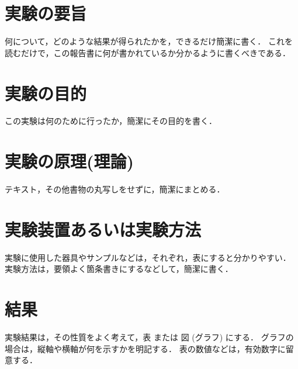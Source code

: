 \documentclass[12pt]{jarticle}
\begin{document}



\section{実験の要旨}
何について，どのような結果が得られたかを，できるだけ簡潔に書く．
これを読むだけで，この報告書に何が書かれているか分かるように書くべきである．

\section{実験の目的}
この実験は何のために行ったか，簡潔にその目的を書く．

\section{実験の原理(理論)}
テキスト，その他書物の丸写しをせずに，簡潔にまとめる．

\section{実験装置あるいは実験方法}
実験に使用した器具やサンプルなどは，それぞれ，表にすると分かりやすい．
実験方法は，要領よく箇条書きにするなどして，簡潔に書く．

\section{結果}
実験結果は，その性質をよく考えて，表 または 図 (グラフ) にする．
グラフの場合は，縦軸や横軸が何を示すかを明記する．
表の数値などは，有効数字に留意する．
\end{document}
